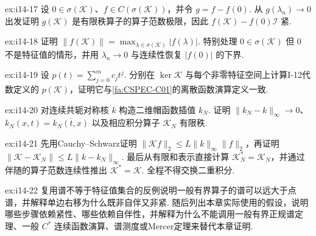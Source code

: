 \begin{FAExercise}[离散函数演算的定义与紧余项]{ex:i14-17}
设 \(\displaystyle0\in\sigma(\mathcal K)\)、\(\displaystyle f\in C(\sigma(\mathcal K))\)，并令 \(\displaystyle g=f-f(0)\). 从 \(\displaystyle g(\lambda_n)\to0\) 出发证明 \(\displaystyle g(\mathcal K)\) 是有限秩算子的算子范数极限，因此 \(\displaystyle f(\mathcal K)-f(0)\mathcal I\) 紧.
\end{FAExercise}

\begin{FAExercise}[函数演算范数等式]{ex:i14-18}
证明 \(\displaystyle \|f(\mathcal K)\|=\max_{\lambda\in\sigma(\mathcal K)}|f(\lambda)|\). 特别处理 \(\displaystyle0\in\sigma(\mathcal K)\) 但 \(\displaystyle0\) 不是特征值的情形，并用 \(\displaystyle \lambda_n\to0\) 与连续性恢复 \(\displaystyle |f(0)|\) 的下界.
\end{FAExercise}

\begin{FAExercise}[多项式兼容性]{ex:i14-19}
设 \(\displaystyle p(t)=\sum_{j=0}^{m}c_jt^j\). 分别在 \(\displaystyle \ker\mathcal K\) 与每个非零特征空间上计算I-12代数定义的 \(\displaystyle p(\mathcal K)\)，证明它与\autoref{fa:CSPEC-C01}的离散函数演算定义一致.
\end{FAExercise}

\begin{FAExercise}[共轭对称核的对称有限秩逼近]{ex:i14-20}
对连续共轭对称核 \(\displaystyle k\) 构造二维帽函数插值 \(\displaystyle k_N\). 证明 \(\displaystyle \|k_N-k\|_\infty\to0\)、\(\displaystyle k_N(x,t)=\overline{k_N(t,x)}\) 以及相应积分算子 \(\displaystyle \mathcal K_N\) 有限秩.
\end{FAExercise}

\begin{FAExercise}{ex:i14-21}
先用Cauchy--Schwarz证明 \(\displaystyle \|\mathcal Kf\|_2\leqslant L\|k\|_\infty\|f\|_2\)，再证明 \(\displaystyle \|\mathcal K-\mathcal K_N\|\leqslant L\|k-k_N\|_\infty\). 最后从有限和表示直接计算 \(\displaystyle \mathcal K_N^*=\mathcal K_N\)，并通过伴随的算子范数连续性推出 \(\displaystyle \mathcal K^*=\mathcal K\). 全程不得交换二重积分.
\end{FAExercise}

\begin{FAExercise}[边界对照与后继理论]{ex:i14-22}
复用谱不等于特征值集合的反例说明一般有界算子的谱可以远大于点谱，并解释单边右移为什么既非自伴又非紧. 随后列出本章实际使用的假设，说明哪些步骤依赖紧性、哪些依赖自伴性，并解释为什么不能调用一般有界正规谱定理、一般 \(\displaystyle C^*\) 连续函数演算、谱测度或Mercer定理来替代本章证明.
\end{FAExercise}
